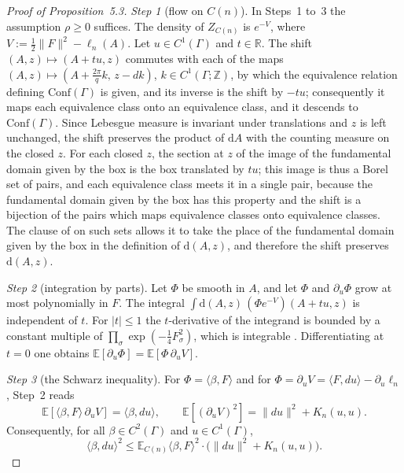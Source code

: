 \documentclass[11pt,letterpaper,reqno]{amsart}
\theoremstyle{definition}
\begin{document}
\begin{proof}[Proof of Proposition~5.3]
\emph{Step 1} (flow on $C(n)$).
In Steps~1 to~3 the assumption $\rho\ge0$ suffices.
The density of $Z_{C(n)}$ is $e^{-V}$, where $V:=\frac12\|F\|^2-\ell_n(A)$.
Let $u\in C^1(\Gamma)$ and $t\in\mathbb R$.
The shift $(A,z)\mapsto(A+tu,z)$ commutes with each of the maps $(A,z)\mapsto(A+\frac{2\pi}{q}k,\,z-dk)$, $k\in C^1(\Gamma;\mathbb Z)$, by which the equivalence relation defining $\mathrm{Conf}(\Gamma)$ is given, and its inverse is the shift by $-tu$;
consequently it maps each equivalence class onto an equivalence class, and it descends to $\mathrm{Conf}(\Gamma)$.
Since Lebesgue measure is invariant under translations and $z$ is left unchanged, the shift preserves the product of $\mathrm dA$ with the counting measure on the closed $z$.
For each closed $z$, the section at $z$ of the image of the fundamental domain given by the box is the box translated by $tu$;
this image is thus a Borel set of pairs, and each equivalence class meets it in a single pair, because the fundamental domain given by the box has this property and the shift is a bijection of the pairs which maps equivalence classes onto equivalence classes.
The clause of \cite[Definition~2.6]{QEDII} on such sets allows it to take the place of the fundamental domain given by the box in the definition of $\mathrm d(A,z)$, and therefore the shift preserves $\mathrm d(A,z)$.

\emph{Step 2} (integration by parts).
Let $\Phi$ be smooth in $A$, and let $\Phi$ and $\partial_u\Phi$ grow at most polynomially in $F$.
The integral $\int\mathrm d(A,z)\,(\Phi e^{-V})(A+tu,z)$ is independent of $t$.
For $|t|\le1$ the $t$-derivative of the integrand is bounded by a constant multiple of $\prod_\sigma\exp(-\frac14F_\sigma^2)$, which is integrable \cite[Lemma~3.14]{QEDII}.
Differentiating at $t=0$ one obtains $\mathbb E[\partial_u\Phi]=\mathbb E[\Phi\,\partial_uV]$.

\emph{Step 3} (the Schwarz inequality).
For $\Phi=\langle\beta,F\rangle$ and for $\Phi=\partial_uV=\langle F,du\rangle-\partial_u\ell_n$, Step~2 reads
\begin{equation*}
\mathbb E[\langle\beta,F\rangle\,\partial_uV]=\langle\beta,du\rangle,\qquad\mathbb E[(\partial_uV)^2]=\|du\|^2+K_n(u,u).
\end{equation*}
Consequently, for all $\beta\in C^2(\Gamma)$ and $u\in C^1(\Gamma)$,
\begin{equation*}
\langle\beta,du\rangle^2\le\mathbb E_{C(n)}\langle\beta,F\rangle^2\cdot\bigl(\|du\|^2+K_n(u,u)\bigr).
\end{equation*}


\end{proof}
\end{document}
